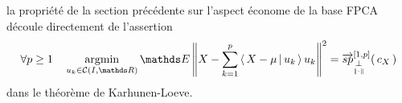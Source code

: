 \begin{rem}
	la propriété de la section précédente sur l'aspect économe de la base FPCA découle directement de l'assertion
	\begin{equation*}
		\forall p \geq 1
		\quad
		\argmin\limits_{u_k \in \mathcal C(I, \mathds R)} \mathds E \left\Vert X - \sum\limits_{k=1}^p \prodscal {X - \mu} {u_k} u_k \right\Vert^2 = \overrightarrow{sp}_{\orthonormal}^{[1,p]}( \, c_X \, )
	\end{equation*}
	dans le théorème de Karhunen-Loeve.
\end{rem}


